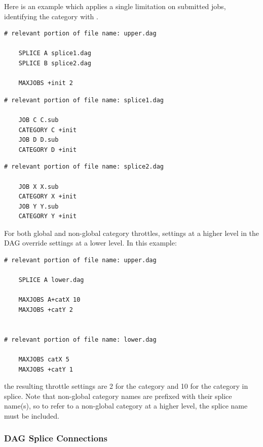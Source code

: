 Here is an example which applies a single limitation on submitted jobs,
identifying the category with . 

\begin{verbatim}
# relevant portion of file name: upper.dag

    SPLICE A splice1.dag
    SPLICE B splice2.dag

    MAXJOBS +init 2
\end{verbatim}

\begin{verbatim}
# relevant portion of file name: splice1.dag

    JOB C C.sub
    CATEGORY C +init
    JOB D D.sub
    CATEGORY D +init

\end{verbatim}

\begin{verbatim}
# relevant portion of file name: splice2.dag

    JOB X X.sub
    CATEGORY X +init
    JOB Y Y.sub
    CATEGORY Y +init

\end{verbatim}

For both global and non-global category throttles, settings at a higher
level in the DAG override settings at a lower level.
In this example:

\begin{verbatim}
# relevant portion of file name: upper.dag

    SPLICE A lower.dag

    MAXJOBS A+catX 10
    MAXJOBS +catY 2


# relevant portion of file name: lower.dag

    MAXJOBS catX 5
    MAXJOBS +catY 1

\end{verbatim}

the resulting throttle settings are 2 for the  category
and 10 for the  category in splice.
Note that non-global category names are
prefixed with their splice name(s), so to refer to a non-global category 
at a higher level, the splice name must be included.

\subsubsection{\label{sec:DAGSpliceConnections}DAG Splice Connections}

